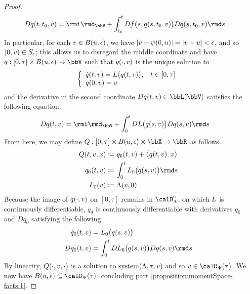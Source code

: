 \begin{proof}
\begin{align*}
    D q(t,t_0,\vecVar) 
    &= \id_\vecSpace + \int_{t_0}^t Df\big(s, q(s,t_0,\vecVar) \big) Dq(s, t_0, \vecVar) \rmd s
  \end{align*}
  In particular, for each $v \in B(u, \epsilon)$, we have $|v - \psi(0,u)| = |v - u| < \epsilon$, and so $(0,v) \in S_\epsilon$; this allows us to disregard the middle coordinate and have $q: [0,\tau] \times B(\momentVar,\epsilon) \rightarrow \vecSpace$ such that $q(\cdot,v)$ is the unique solution to 
  \begin{equation*}
    \left\{\begin{array}{ll}
      \dot q(t, v) = L\big(q(t, v)\big), & t \in [0,\tau] \\
      q(0, v) = v
    \end{array}\right.
  \end{equation*}
  and the derivative in the second coordinate $Dq(t,\vecVar) \in \bbL(\vecSpace)$ satisfies the following equation.
  \begin{align*}
    D q(t,\vecVar) &= \id_\vecSpace + \int_0^t D\odePart\big(q(s,\vecVar)\big)Dq(s, \vecVar) \rmd s
  \end{align*}
  From here, we may define $Q: [0,\tau] \times B(\momentVar,\epsilon) \times \stateSpace \rightarrow \bbR$ as follows.
  \begin{align*}
    Q(t,\vecVar,\stateVar) &\defeq q_0(t,\vecVar) + \bprj{q(t,\vecVar)}{\stateVar} \\
    q_0(t,\vecVar) &\defeq \int_0^t \odePart_0\big(q(s,\vecVar)\big) \rmd s \\
    \odePart_0(\vecVar) &\defeq \ode(\vecVar, 0)
  \end{align*}
  Because the image of $q(\cdot, v)$ on $[0,\tau]$ remains in $\odeSpace^\circ$, on which $L$ is continuously differentiable, $q_0$ is continuously differentiable with derivatives $\dot q_0$ and $D q_0$ satisfying the following.
  \begin{align*}
    \dot q_0(t,\vecVar) &= \odePart_0\big(q(s,\vecVar)\big) \\
    D q_0(t, \vecVar) &= \int_0^t D\odePart_0\big( q(s, \vecVar) \big) Dq(s, \vecVar) \rmd s
  \end{align*}
  By linearity, $Q(\cdot,v,\cdot)$ is a solution to $\operatorname{system}(\Lambda, \tau, v)$ and so $\vecVar \in \momentSpace(\tau)$.
  We now have $B(\momentVar,\epsilon) \subseteq \momentSpace(\tau)$, concluding part \ref{proposition:momentSpace-facts:1}.

\end{proof}
